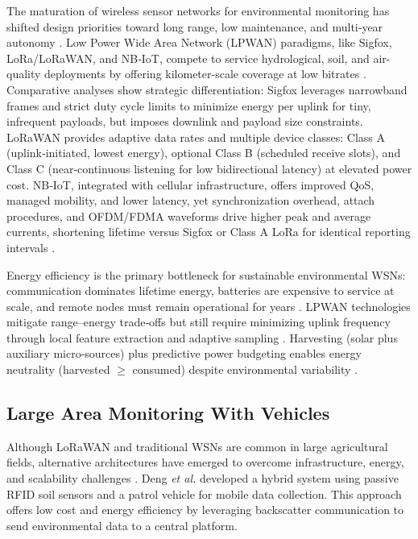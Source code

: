 \documentclass[conference]{IEEEtran}
\begin{document}
The maturation of wireless sensor networks for environmental monitoring has shifted design priorities toward long range, low maintenance, and multi‑year autonomy \cite{pule_2017_wireless}. Low Power Wide Area Network (LPWAN) paradigms, like Sigfox, LoRa/LoRaWAN, and NB‑IoT, compete to service hydrological, soil, and air-quality deployments by offering kilometer-scale coverage at low bitrates \cite{mekki_2019_a}. Comparative analyses show strategic differentiation: Sigfox leverages narrowband frames and strict duty cycle limits to minimize energy per uplink for tiny, infrequent payloads, but imposes downlink and payload size constraints. LoRaWAN provides adaptive data rates and multiple device classes: Class A (uplink‑initiated, lowest energy), optional Class B (scheduled receive slots), and Class C (near‑continuous listening for low bidirectional latency) at elevated power cost. NB‑IoT, integrated with cellular infrastructure, offers improved QoS, managed mobility, and lower latency, yet synchronization overhead, attach procedures, and OFDM/FDMA waveforms drive higher peak and average currents, shortening lifetime versus Sigfox or Class A LoRa for identical reporting intervals \cite{mekki_2019_a}.

Energy efficiency is the primary bottleneck for sustainable environmental WSNs: communication dominates lifetime energy, batteries are expensive to service at scale, and remote nodes must remain operational for years \cite{shaikh_2016_energy}. LPWAN technologies mitigate range–energy trade‑offs but still require minimizing uplink frequency through local feature extraction and adaptive sampling \cite{mekki_2019_a}. Harvesting (solar plus auxiliary micro-sources) plus predictive power budgeting enables energy neutrality (harvested $\geq$ consumed) despite environmental variability \cite{shaikh_2016_energy}.

\subsection{Large Area Monitoring With Vehicles}

Although LoRaWAN and traditional WSNs are common in large agricultural fields, alternative architectures have emerged to overcome infrastructure, energy, and scalability challenges \cite{yellampalli_2021_wireless}. Deng \textit{et al.} \cite{deng_2020_novel} developed a hybrid system using passive RFID soil sensors and a patrol vehicle for mobile data collection. This approach offers low cost and energy efficiency by leveraging backscatter communication to send environmental data to a central platform.
\end{document}
